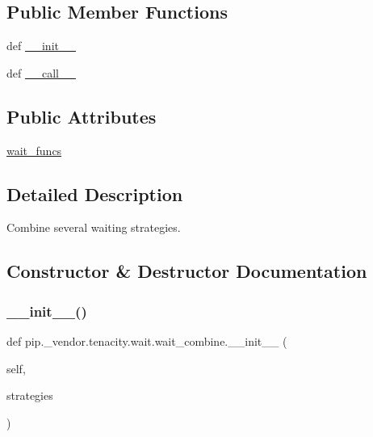 \subsection*{Public Member Functions}
\begin{DoxyCompactItemize}
\item 
def \hyperlink{classpip_1_1__vendor_1_1tenacity_1_1wait_1_1wait__combine_a7015c4081e283ac9ef1b3fac21b7dbe2}{\+\_\+\+\_\+init\+\_\+\+\_\+}
\item 
def \hyperlink{classpip_1_1__vendor_1_1tenacity_1_1wait_1_1wait__combine_a6b859484883756fae1e7145534cef1f7}{\+\_\+\+\_\+call\+\_\+\+\_\+}
\end{DoxyCompactItemize}
\subsection*{Public Attributes}
\begin{DoxyCompactItemize}
\item 
\hyperlink{classpip_1_1__vendor_1_1tenacity_1_1wait_1_1wait__combine_afd00c58c424026bd99d052ddf9adc316}{wait\+\_\+funcs}
\end{DoxyCompactItemize}


\subsection{Detailed Description}
\begin{DoxyVerb}Combine several waiting strategies.\end{DoxyVerb}
 

\subsection{Constructor \& Destructor Documentation}
\mbox{\label{classpip_1_1__vendor_1_1tenacity_1_1wait_1_1wait__combine_a7015c4081e283ac9ef1b3fac21b7dbe2}} 
\subsubsection{\texorpdfstring{\+\_\+\+\_\+init\+\_\+\+\_\+()}{\_\_init\_\_()}}
{\footnotesize\ttfamily def pip.\+\_\+vendor.\+tenacity.\+wait.\+wait\+\_\+combine.\+\_\+\+\_\+init\+\_\+\+\_\+ (\begin{DoxyParamCaption}\item[{}]{self,  }\item[{}]{strategies }\end{DoxyParamCaption})}




